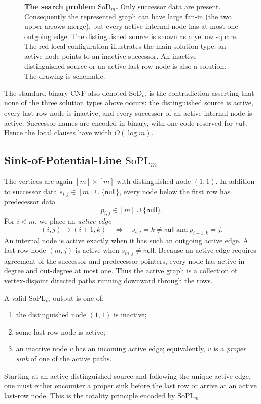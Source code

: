 \documentclass[11pt]{article}
\theoremstyle{definition}
\newcommand{\SoPL}{\mathrm{SoPL}}
\newcommand{\SoD}{\mathrm{SoD}}
\begin{document}
\begin{figure}[htbp]
{%
}
\caption{\textbf{The search problem $\SoD_m$.}
Only successor data are present.  Consequently the represented graph can have large
fan-in (the two upper arrows merge), but every active internal node has at most one
outgoing edge.  The distinguished source is shown as a yellow square.  The red local
configuration illustrates the main solution type: an active node points to an
inactive successor.  An inactive distinguished source or an active last-row node is
also a solution.  The drawing is schematic.}
\label{fig:sod-definition}
\end{figure}

The standard binary CNF also denoted $\SoD_m$ is the contradiction asserting that
none of the three solution types above occurs: the distinguished source is active,
every last-row node is inactive, and every successor of an active internal node is
active.  Successor names are encoded in binary, with one code reserved for
$\mathsf{null}$.  Hence the local clauses have width $O(\log m)$.

\subsection{Sink-of-Potential-Line $\SoPL_m$}\label{subsec:sopl-definition}
The vertices are again $[m]\times[m]$ with distinguished node $(1,1)$.  In addition
to successor data $s_{i,j}\in[m]\cup\{\mathsf{null}\}$, every node below the first
row has predecessor data
\[
  p_{i,j}\in[m]\cup\{\mathsf{null}\}.
\]
For $i<m$, we place an \emph{active edge}
\[
  (i,j)\longrightarrow(i+1,k)
  \quad\Longleftrightarrow\quad
  s_{i,j}=k\ne\mathsf{null}
  \ \text{and}\ 
  p_{i+1,k}=j.
  \tag{SP}\label{eq:sopl-active-edge}
\]
An internal node is active exactly when it has such an outgoing active edge.  A
last-row node $(m,j)$ is active when $s_{m,j}\ne\mathsf{null}$.  Because an active
edge requires agreement of the successor and predecessor pointers, every node has
active in-degree and out-degree at most one.  Thus the active graph is a collection
of vertex-disjoint directed paths running downward through the rows.

A valid $\SoPL_m$ output is one of:
\begin{enumerate}[label=(\roman*),leftmargin=2.3em]
\item the distinguished node $(1,1)$ is inactive;
\item some last-row node is active;
\item an inactive node $v$ has an incoming active edge; equivalently, $v$ is a
\emph{proper sink} of one of the active paths.
\end{enumerate}
Starting at an active distinguished source and following the unique active edge, one
must either encounter a proper sink before the last row or arrive at an active
last-row node.  This is the totality principle encoded by $\SoPL_m$.
\end{document}
